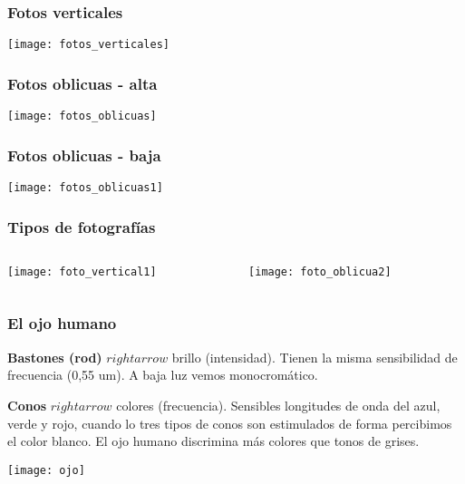 \documentclass[14pt]{beamer}
\begin{document}
\begin{frame}
\frametitle{Fotos verticales}
\begin{center}
\texttt{[image: fotos\_verticales]}
\end{center}
\end{frame}
\begin{frame}
\frametitle{Fotos oblicuas - alta}
\begin{center}
\texttt{[image: fotos\_oblicuas]}
\end{center}
\end{frame}
\begin{frame}
\frametitle{Fotos oblicuas - baja}
\begin{center}
\texttt{[image: fotos\_oblicuas1]}
\end{center}
\end{frame}
\begin{frame}
\frametitle{Tipos de fotografías}
\begin{columns}
\begin{column}{0.5\linewidth}
\begin{center}
\texttt{[image: foto\_vertical1]}
\end{center}
\end{column}
\begin{column}{0.5\linewidth}
\begin{figure}
\texttt{[image: foto\_oblicua2]}
\end{figure}
\end{column}
\end{columns}
\end{frame}
\begin{frame}
\frametitle{El ojo humano}
\scriptsize{
\textbf{Bastones (rod)} $rightarrow$ brillo (intensidad). Tienen la misma sensibilidad de frecuencia (0,55 um). A baja luz vemos monocromático.

\textbf{Conos} $rightarrow$ colores (frecuencia). Sensibles longitudes de onda del azul, verde y rojo, cuando lo tres tipos de conos son estimulados de forma percibimos el color blanco. El ojo humano discrimina más colores que tonos de grises.
}
\begin{center}
\texttt{[image: ojo]}
\end{center}
\end{frame}
\end{document}

